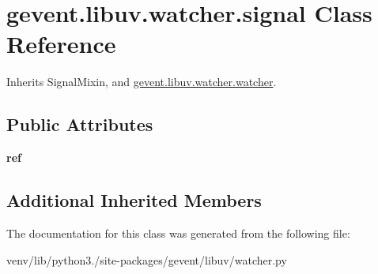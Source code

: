 \hypertarget{classgevent_1_1libuv_1_1watcher_1_1signal}{}\section{gevent.\+libuv.\+watcher.\+signal Class Reference}
\label{classgevent_1_1libuv_1_1watcher_1_1signal}


Inherits Signal\+Mixin, and \hyperlink{classgevent_1_1libuv_1_1watcher_1_1watcher}{gevent.\+libuv.\+watcher.\+watcher}.

\subsection*{Public Attributes}
\begin{DoxyCompactItemize}
\item 
\mbox{\label{classgevent_1_1libuv_1_1watcher_1_1signal_ab35587cd14920305367dea4521321fe9}} 
{\bfseries ref}
\end{DoxyCompactItemize}
\subsection*{Additional Inherited Members}


The documentation for this class was generated from the following file\+:\begin{DoxyCompactItemize}
\item 
venv/lib/python3./site-\/packages/gevent/libuv/watcher.\+py\end{DoxyCompactItemize}
